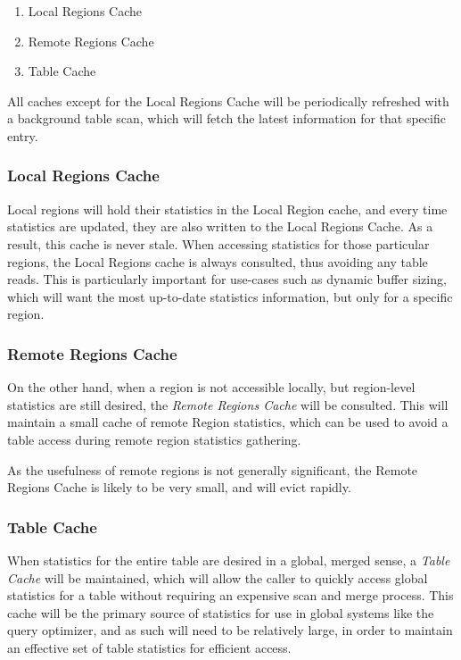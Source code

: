 \begin{enumerate}
				\item Local Regions Cache
				\item Remote Regions Cache
				\item Table Cache
\end{enumerate}

All caches except for the Local Regions Cache will be periodically refreshed with a background table scan, which will fetch the latest information for that specific entry. 

\subsubsection{Local Regions Cache}
Local regions will hold their statistics in the Local Region cache, and every time statistics are updated, they are also written to the Local Regions Cache. As a result, this cache is never stale. When accessing statistics for those particular regions, the Local Regions cache is always consulted, thus avoiding any table reads. This is particularly important for use-cases such as dynamic buffer sizing, which will want the most up-to-date statistics information, but only for a specific region.

\subsubsection{Remote Regions Cache}
On the other hand, when a region is not accessible locally, but region-level statistics are still desired, the \emph{Remote Regions Cache} will be consulted. This will maintain a small cache of remote Region statistics, which can be used to avoid a table access during remote region statistics gathering.

As the usefulness of remote regions is not generally significant, the Remote Regions Cache is likely to be very small, and will evict rapidly.

\subsubsection{Table Cache}
When statistics for the entire table are desired in a global, merged sense, a \emph{Table Cache} will be maintained, which will allow the caller to quickly access global statistics for a table without requiring an expensive scan and merge process. This cache will be the primary source of statistics for use in global systems like the query optimizer, and as such will need to be relatively large, in order to maintain an effective set of table statistics for efficient access.

